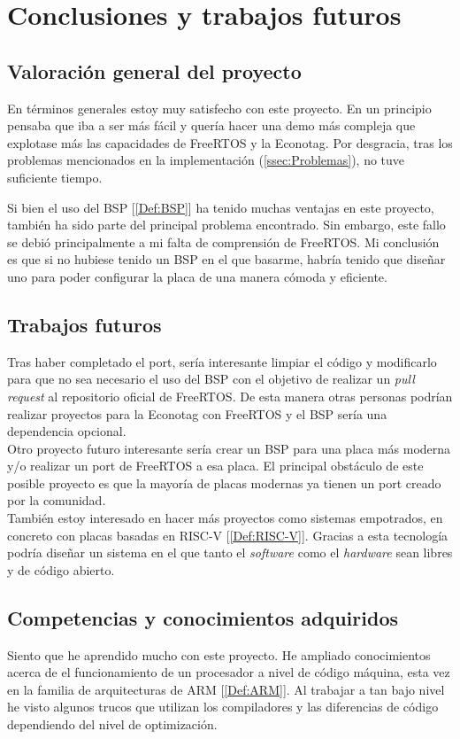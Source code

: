 \chapter{Conclusiones y trabajos futuros}
\section{Valoración general del proyecto}
En términos generales estoy muy satisfecho con este proyecto. En un principio pensaba que iba a ser más fácil y quería hacer una demo más compleja que explotase más las capacidades de FreeRTOS y la Econotag. Por desgracia, tras los problemas mencionados en la implementación (\autoref{ssec:Problemas}), no tuve suficiente tiempo.

Si bien el uso del BSP [\ref{Def:BSP}] ha tenido muchas ventajas en este proyecto, también ha sido parte del principal problema encontrado. Sin embargo, este fallo se debió principalmente a mi falta de comprensión de FreeRTOS. Mi conclusión es que si no hubiese tenido un BSP en el que basarme, habría tenido que diseñar uno para poder configurar la placa de una manera cómoda y eficiente.

\section{Trabajos futuros}
Tras haber completado el port, sería interesante limpiar el código y modificarlo para que no sea necesario el uso del BSP con el objetivo de realizar un \emph{pull request} al repositorio oficial de FreeRTOS. De esta manera otras personas podrían realizar proyectos para la Econotag con FreeRTOS y el BSP sería una dependencia opcional.\\

Otro proyecto futuro interesante sería crear un BSP para una placa más moderna y/o realizar un port de FreeRTOS a esa placa. El principal obstáculo de este posible proyecto es que la mayoría de placas modernas ya tienen un port creado por la comunidad.\\

También estoy interesado en hacer más proyectos como sistemas empotrados, en concreto con placas basadas en RISC-V [\ref{Def:RISC-V}]. Gracias a esta tecnología podría diseñar un sistema en el que tanto el \emph{software} como el \emph{hardware} sean libres y de código abierto.


\section{Competencias y conocimientos adquiridos}
Siento que he aprendido mucho con este proyecto. He ampliado conocimientos acerca de el funcionamiento de un procesador a nivel de código máquina, esta vez en la familia de arquitecturas de ARM [\ref{Def:ARM}]. Al trabajar a tan bajo nivel he visto algunos trucos que utilizan los compiladores y las diferencias de código dependiendo del nivel de optimización.\\

